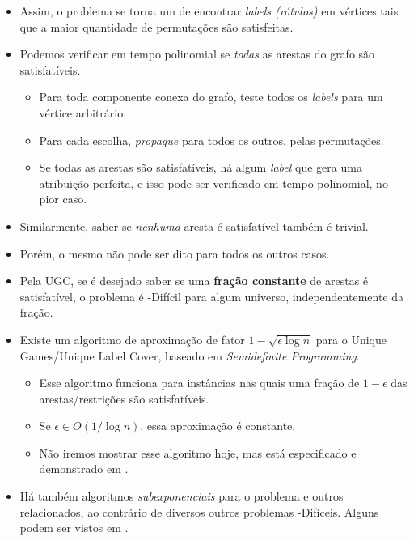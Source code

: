 \documentclass[12pt,a4paper]{article}
\begin{document}
\begin{itemize}
    \item Assim, o problema se torna um de encontrar \emph{labels (rótulos)} em vértices tais que a maior quantidade de permutações são satisfeitas.
    \item Podemos verificar em tempo polinomial se \emph{todas} as arestas do grafo são satisfatíveis.
    \begin{itemize}
        \item Para toda componente conexa do grafo, teste todos os \textit{labels} para um vértice arbitrário.
        \item Para cada escolha, \emph{propague} para todos os outros, pelas permutações.
        \item Se todas as arestas são satisfatíveis, há algum \textit{label} que gera uma atribuição perfeita, e isso pode ser verificado em tempo polinomial, no pior caso.
    \end{itemize}
    \item Similarmente, saber se \emph{nenhuma} aresta é satisfatível também é trivial.
    \item Porém, o mesmo não pode ser dito para todos os outros casos.
    \item Pela UGC, se é desejado saber se uma \textbf{fração constante} de arestas é satisfatível, o problema é \np-Difícil para algum universo, independentemente da fração.
    \item Existe um algoritmo de aproximação de fator $1-\sqrt{\epsilon \log n}$ para o Unique Games/Unique Label Cover, baseado em \emph{Semidefinite Programming}. 
    \begin{itemize}
        \item Esse algoritmo funciona para instâncias nas quais uma fração de $1-\epsilon$ das arestas/restrições são satisfatíveis.
        \item Se $\epsilon \in O(1/\log n)$, essa aproximação é constante.
        \item Não iremos mostrar esse algoritmo hoje, mas está especificado e demonstrado em \cite{design_approx_algs}.
    \end{itemize}
    \item Há também algoritmos \emph{subexponenciais} para o problema e outros relacionados, ao contrário de diversos outros problemas \np-Difíceis. Alguns podem ser vistos em \cite{subexponential}.
\end{itemize}
\end{document}

